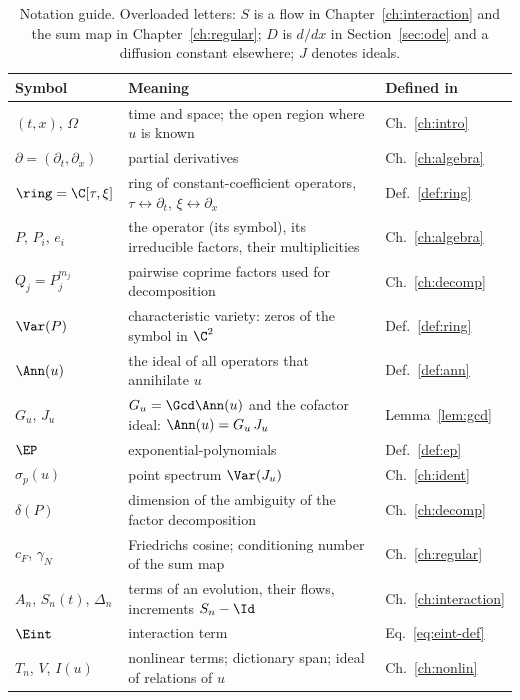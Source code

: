 \begin{table}[!htb]
\centering\small
\begin{tabular}{@{}L{3.1cm}L{8.9cm}L{2.5cm}@{}}
\toprule
Symbol & Meaning & Defined in\\\midrule
$(t,x)$, $\Omega$ & time and space; the open region where $u$ is known & Ch.~\ref{ch:intro}\\
$\partial=(\partial_t,\partial_x)$ & partial derivatives & Ch.~\ref{ch:algebra}\\
$\ring=\C[\tau,\xi]$ & ring of constant-coefficient operators, $\tau\leftrightarrow\partial_t$, $\xi\leftrightarrow\partial_x$ & Def.~\ref{def:ring}\\
$P$, $P_i$, $e_i$ & the operator (its symbol), its irreducible factors, their multiplicities & Ch.~\ref{ch:algebra}\\
$Q_j=P_j^{m_j}$ & pairwise coprime factors used for decomposition & Ch.~\ref{ch:decomp}\\
$\Var(P)$ & characteristic variety: zeros of the symbol in $\C^2$ & Def.~\ref{def:ring}\\
$\Ann(u)$ & the ideal of all operators that annihilate $u$ & Def.~\ref{def:ann}\\
$G_u$, $J_u$ & $G_u=\Gcd\Ann(u)$ and the cofactor ideal: $\Ann(u)=G_u\,J_u$ & Lemma~\ref{lem:gcd}\\
$\EP$ & exponential-polynomials & Def.~\ref{def:ep}\\
$\sigma_p(u)$ & point spectrum $\Var(J_u)$ & Ch.~\ref{ch:ident}\\
$\delta(P)$ & dimension of the ambiguity of the factor decomposition & Ch.~\ref{ch:decomp}\\
$c_F$, $\gamma_N$ & Friedrichs cosine; conditioning number of the sum map & Ch.~\ref{ch:regular}\\
$A_n$, $S_n(t)$, $\Delta_n$ & terms of an evolution, their flows, increments $S_n-\Id$ & Ch.~\ref{ch:interaction}\\
$\Eint$ & interaction term & Eq.~\eqref{eq:eint-def}\\
$T_n$, $V$, $I(u)$ & nonlinear terms; dictionary span; ideal of relations of $u$ & Ch.~\ref{ch:nonlin}\\
\bottomrule
\end{tabular}
\caption{Notation guide. Overloaded letters: $S$ is a flow in Chapter~\ref{ch:interaction} and the sum map in Chapter~\ref{ch:regular}; $D$ is $d/dx$ in Section~\ref{sec:ode} and a diffusion constant elsewhere; $J$ denotes ideals.}\label{tab:notation}
\end{table}

